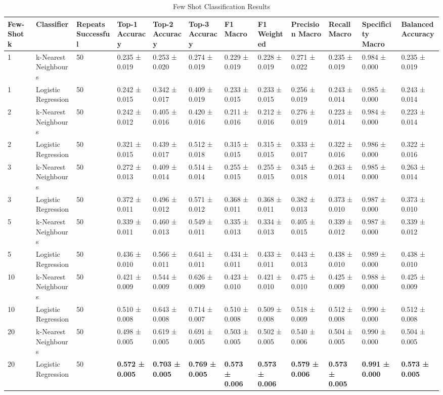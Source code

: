 
\begin{table}[ht]
\centering
\tiny  %
\caption{Few Shot Classification Results}
\label{tab:few_shotclassification_results}
\begin{tabularx}{\textwidth}{lXXXXXXXXXXX}
\toprule
Few-Shot k & Classifier & Repeats Successful & Top-1 Accuracy & Top-2 Accuracy & Top-3 Accuracy & F1 Macro & F1 Weighted & Precision Macro & Recall Macro & Specificity Macro & Balanced Accuracy \\
\midrule
1 & k-Nearest Neighbours & 50 & 0.235 ± 0.019 & 0.253 ± 0.020 & 0.274 ± 0.019 & 0.229 ± 0.019 & 0.228 ± 0.019 & 0.271 ± 0.022 & 0.235 ± 0.019 & 0.984 ± 0.000 & 0.235 ± 0.019 \\
1 & Logistic Regression & 50 & 0.242 ± 0.015 & 0.342 ± 0.017 & 0.409 ± 0.019 & 0.233 ± 0.015 & 0.233 ± 0.015 & 0.256 ± 0.019 & 0.243 ± 0.014 & 0.985 ± 0.000 & 0.243 ± 0.014 \\
2 & k-Nearest Neighbours & 50 & 0.242 ± 0.012 & 0.405 ± 0.016 & 0.420 ± 0.016 & 0.211 ± 0.016 & 0.212 ± 0.016 & 0.276 ± 0.019 & 0.223 ± 0.014 & 0.984 ± 0.000 & 0.223 ± 0.014 \\
2 & Logistic Regression & 50 & 0.321 ± 0.015 & 0.439 ± 0.017 & 0.512 ± 0.018 & 0.315 ± 0.015 & 0.315 ± 0.015 & 0.333 ± 0.017 & 0.322 ± 0.016 & 0.986 ± 0.000 & 0.322 ± 0.016 \\
3 & k-Nearest Neighbours & 50 & 0.272 ± 0.013 & 0.409 ± 0.014 & 0.514 ± 0.014 & 0.255 ± 0.015 & 0.255 ± 0.015 & 0.345 ± 0.018 & 0.263 ± 0.014 & 0.985 ± 0.000 & 0.263 ± 0.014 \\
3 & Logistic Regression & 50 & 0.372 ± 0.011 & 0.496 ± 0.012 & 0.571 ± 0.012 & 0.368 ± 0.011 & 0.368 ± 0.011 & 0.382 ± 0.013 & 0.373 ± 0.010 & 0.987 ± 0.000 & 0.373 ± 0.010 \\
5 & k-Nearest Neighbours & 50 & 0.339 ± 0.011 & 0.460 ± 0.013 & 0.549 ± 0.011 & 0.335 ± 0.013 & 0.334 ± 0.013 & 0.405 ± 0.015 & 0.339 ± 0.012 & 0.987 ± 0.000 & 0.339 ± 0.012 \\
5 & Logistic Regression & 50 & 0.436 ± 0.010 & 0.566 ± 0.011 & 0.641 ± 0.011 & 0.434 ± 0.011 & 0.433 ± 0.011 & 0.443 ± 0.013 & 0.438 ± 0.010 & 0.989 ± 0.000 & 0.438 ± 0.010 \\
10 & k-Nearest Neighbours & 50 & 0.421 ± 0.009 & 0.544 ± 0.009 & 0.626 ± 0.009 & 0.423 ± 0.010 & 0.421 ± 0.010 & 0.475 ± 0.010 & 0.425 ± 0.009 & 0.988 ± 0.000 & 0.425 ± 0.009 \\
10 & Logistic Regression & 50 & 0.510 ± 0.008 & 0.643 ± 0.008 & 0.714 ± 0.007 & 0.510 ± 0.008 & 0.509 ± 0.008 & 0.518 ± 0.009 & 0.512 ± 0.008 & 0.990 ± 0.000 & 0.512 ± 0.008 \\
20 & k-Nearest Neighbours & 50 & 0.498 ± 0.005 & 0.619 ± 0.005 & 0.691 ± 0.005 & 0.503 ± 0.005 & 0.502 ± 0.005 & 0.540 ± 0.006 & 0.504 ± 0.005 & 0.990 ± 0.000 & 0.504 ± 0.005 \\
20 & Logistic Regression & 50 & \textbf{0.572 ± 0.005} & \textbf{0.703 ± 0.005} & \textbf{0.769 ± 0.005} & \textbf{0.573 ± 0.006} & \textbf{0.573 ± 0.006} & \textbf{0.579 ± 0.006} & \textbf{0.573 ± 0.005} & \textbf{0.991 ± 0.000} & \textbf{0.573 ± 0.005} \\
\bottomrule
\bottomrule
\end{tabularx}
\end{table}
